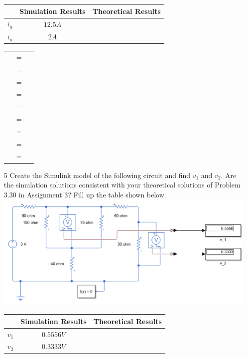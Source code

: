 \documentclass[a4paper]{article}
\begin{document}
\begin{itemize}
	      \begin{tabular}{|c|c|c|}
	      	\hline
	      	        & Simulation Results & Theoretical Results \\
	      	\hline
	      	$i_{g}$ & $12.5A$            &                     \\
	      	\hline
	      	$i_{o}$ & $2A$               &                     \\
	      	\hline
          \end{tabular} 
          \begin{tabular}{rcl}
            & $=$ &   \\
            & $=$ &   \\
            & $=$ &   \\
            & $=$ &   \\
            & $=$ &   \\
            & $=$ &   \\
            & $=$ &   \\
            & $=$ &   \\
            & $=$ &   \\
      \end{tabular}
	\item[5] Create the Simulink model of the following circuit and find $v_{1}$ and $v_{2}$. Are the simulation solutions consistent with your theoretical solutions of Problem 3.30 in Assignment 3? Fill up the table shown below. \\
	      \includegraphics[scale=0.5]{circuit-3.png} \\      
	      \begin{tabular}{|c|c|c|}
	      	\hline
	      	        & Simulation Results & Theoretical Results \\
	      	\hline
	      	$v_{1}$ & $0.5556V$          &                     \\
	      	\hline
	      	$v_{2}$ & $0.3333V$          &                     \\

\end{tabular}
\end{itemize}
\end{document}
